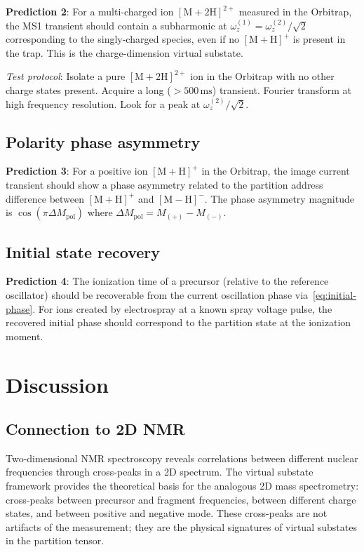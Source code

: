 \documentclass[twocolumn,10pt,a4paper]{article}
\theoremstyle{thmstyle}
\theoremstyle{definition}
\theoremstyle{remark}
\begin{document}
\textbf{Prediction 2}: For a multi-charged ion $[\mathrm{M+2H}]^{2+}$
measured in the Orbitrap, the MS1 transient should contain a subharmonic
at $\omega_z^{(1)} = \omega_z^{(2)}/\sqrt{2}$ corresponding to the
singly-charged species, even if no $[\mathrm{M+H}]^+$ is present in
the trap. This is the charge-dimension virtual substate.

\textit{Test protocol}: Isolate a pure $[\mathrm{M+2H}]^{2+}$ ion in
the Orbitrap with no other charge states present. Acquire a long
($>500\,\mathrm{ms}$) transient. Fourier transform at high frequency
resolution. Look for a peak at $\omega_z^{(2)}/\sqrt{2}$.

\subsection{Polarity phase asymmetry}

\textbf{Prediction 3}: For a positive ion $[\mathrm{M+H}]^+$ in the
Orbitrap, the image current transient should show a phase asymmetry
related to the partition address difference between $[\mathrm{M+H}]^+$
and $[\mathrm{M-H}]^-$. The phase asymmetry magnitude is
$\cos(\pi\Delta M_{\text{pol}})$ where $\Delta M_{\text{pol}} = M_{(+)} - M_{(-)}$.

\subsection{Initial state recovery}

\textbf{Prediction 4}: The ionization time of a precursor (relative to
the reference oscillator) should be recoverable from the current
oscillation phase via~\eqref{eq:initial-phase}. For ions created by
electrospray at a known spray voltage pulse, the recovered initial phase
should correspond to the partition state at the ionization moment.

\section{Discussion}
\label{sec:discussion}

\subsection{Connection to 2D NMR}

Two-dimensional NMR spectroscopy \citep{jeener1979,ernst1987} reveals
correlations between different nuclear frequencies through cross-peaks
in a 2D spectrum. The virtual substate framework provides the theoretical
basis for the analogous 2D mass spectrometry: cross-peaks between
precursor and fragment frequencies, between different charge states, and
between positive and negative mode. These cross-peaks are not artifacts
of the measurement; they are the physical signatures of virtual substates
in the partition tensor.
\end{document}

